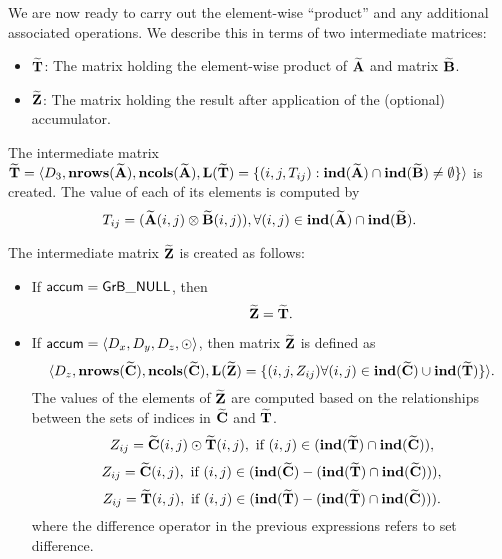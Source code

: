 We are now ready to carry out the element-wise ``product'' and any additional 
associated operations.  We describe this in terms of two intermediate matrices:
\begin{itemize}
	\item ${\bf \widetilde{T}}$: The matrix holding the element-wise product of
    ${\bf \widetilde{A}}$ and matrix ${\bf \widetilde{B}}$.
	\item ${\bf \widetilde{Z}}$: The matrix holding the result after 
    application of the (optional) accumulator.
\end{itemize}

The intermediate matrix ${\bf \widetilde{T}} = \langle
D_3, \bold{nrows}({\bf \widetilde{A}}), \bold{ncols}({\bf \widetilde{A}}),
\bold{L}({\bf \widetilde{T}}) =
\{(i,j,T_{ij}) : \bold{ind}({\bf \widetilde{A}}) \cap 
\bold{ind}({\bf \widetilde{B}})
 \neq \emptyset \} \rangle$
is created.  The value of each of its elements is computed by 
\[T_{ij} = ({\bf \widetilde{A}}(i,j)
\otimes {\bf \widetilde{B}}(i,j)), \forall (i,j) \in 
\bold{ind}({\bf \widetilde{A}}) \cap 
\bold{ind}({\bf \widetilde{B}}).\]

The intermediate matrix ${\bf \widetilde{Z}}$ is created as follows:
\begin{itemize}
    \item If ${\sf accum} = {\sf GrB\_NULL}$, then \[ {\bf \widetilde{Z}} = {\bf \widetilde{T}}.\]

    \item If ${\sf accum} = \langle D_x, D_y, D_z, \odot \rangle$, then matrix ${\bf \widetilde{Z}}$ is defined as 
        \[ \langle D_z, \bold{nrows}({\bf \widetilde{C}}), \bold{ncols}({\bf \widetilde{C}}), \bold{L}({\bf \widetilde{Z}})
		= \{(i,j,Z_{ij})  \forall (i,j) \in \bold{ind}({\bf \widetilde{C}}) \cup 
        \bold{ind}({\bf \widetilde{T}}) \} \rangle.\]
    The values of the elements of ${\bf \widetilde{Z}}$ are computed based on the relationships between the sets of indices in ${\bf \widetilde{C}}$ and ${\bf \widetilde{T}}$.
\[
Z_{ij} = {\bf \widetilde{C}}(i,j) \odot {\bf \widetilde{T}}(i,j), \ \mbox{if}\  (i,j) \in  (\bold{ind}({\bf \widetilde{T}}) \cap \bold{ind}({\bf \widetilde{C}})),
\]
\[
Z_{ij} = \matrix{\widetilde{C}}(i,j), \ \mbox{if}\  (i,j) \in  (\bold{ind}(\matrix{\widetilde{C}}) - (\bold{ind}(\matrix{\widetilde{T}}) \cap \bold{ind}(\matrix{\widetilde{C}}))),
\]
\[
Z_{ij} = \matrix{\widetilde{T}}(i,j), \ \mbox{if}\  (i,j) \in  (\bold{ind}(\matrix{\widetilde{T}}) - (\bold{ind}(\matrix{\widetilde{T}}) \cap \bold{ind}(\matrix{\widetilde{C}}))).
\]
where the difference operator in the previous expressions refers to set difference.
\end{itemize}

